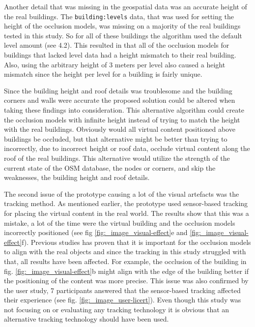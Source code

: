 Another detail that was missing in the geospatial data was an accurate height of the real buildings. The \texttt{building:levels} data, that was used for setting the height of the occlusion models, was missing on a majority of the real buildings tested in this study. So for all of these buildings the algorithm used the default level amount (see 4.2). This resulted in that all of the occlusion models for buildings that lacked level data had a height mismatch to their real building. Also, using the arbitrary height of 3 meters per level also caused a height mismatch since the height per level for a building is fairly unique. 

Since the building height and roof details was troublesome and the building corners and walls were accurate the proposed solution could be altered when taking these findings into consideration. This alternative algorithm could create the occlusion models with infinite height instead of trying to match the height with the real buildings. Obviously would all virtual content positioned above buildings be occluded, but that alternative might be better than trying to incorrectly, due to incorrect height or roof data, occlude virtual content along the roof of the real buildings. This alternative would utilize the strength of the current state of the OSM database, the nodes or corners, and skip the weaknesses, the building height and roof details. 

The second issue of the prototype causing a lot of the visual artefacts was the tracking method. As mentioned earlier, the prototype used sensor-based tracking for placing the virtual content in the real world. The results show that this was a mistake, a lot of the time were the virtual building and the occlusion models incorrectly positioned (see fig \ref{fig:_image_visual-effect}e and \ref{fig:_image_visual-effect}f). Previous studies has proven that it is important for the occlusion models to align with the real objects and since the tracking in this study struggled with that, all results have been affected. For example, the occlusion of the building in fig. \ref{fig:_image_visual-effect}b might align with the edge of the building better if the positioning of the content was more precise. This issue was also confirmed by the user study, 7 participants answered that the sensor-based tracking affected their experience (see fig. \ref{fig:_image_user-licert}). Even though this study was not focusing on or evaluating any tracking technology it is obvious that an alternative tracking technology should have been used.

